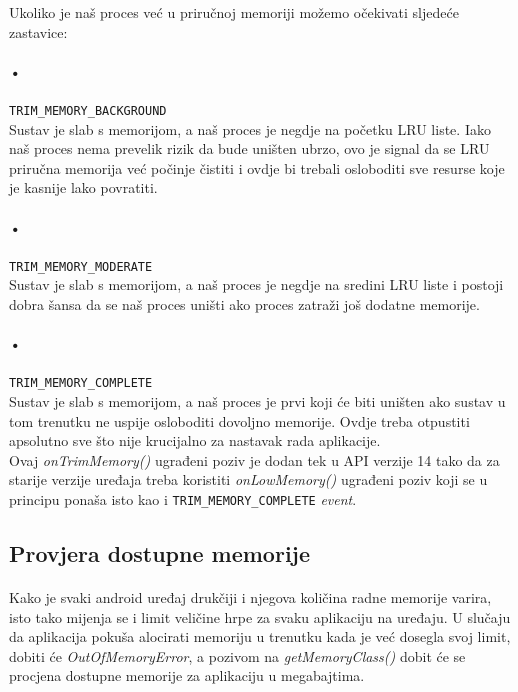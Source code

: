 \documentclass[times, utf8, zavrsni]{fer}
\begin{document}
\noindent
Ukoliko je naš proces već u priručnoj memoriji možemo očekivati sljedeće zastavice:

\paragraph{•}
\verb|TRIM_MEMORY_BACKGROUND|\\
Sustav je slab s memorijom, a naš proces je negdje na početku LRU liste. Iako naš proces nema prevelik rizik da bude uništen ubrzo, ovo je signal da se LRU priručna memorija već počinje čistiti i ovdje bi trebali osloboditi sve resurse koje je kasnije lako povratiti.

\paragraph{•}
\verb|TRIM_MEMORY_MODERATE|\\
Sustav je slab s memorijom, a naš proces je negdje na sredini LRU liste i postoji dobra šansa da se naš proces uništi ako proces zatraži još dodatne memorije.

\paragraph{•}
\verb|TRIM_MEMORY_COMPLETE|\\
Sustav je slab s memorijom, a naš proces je prvi koji će biti uništen ako sustav u tom trenutku ne uspije osloboditi dovoljno memorije. Ovdje treba otpustiti apsolutno sve što nije krucijalno za nastavak rada aplikacije.\\

Ovaj \textit{onTrimMemory()} ugrađeni poziv je dodan tek u API verzije 14 tako da za starije verzije uređaja treba koristiti \textit{onLowMemory()} ugrađeni poziv koji se u principu ponaša isto kao i \verb|TRIM_MEMORY_COMPLETE| \textit{event}.

\subsection{Provjera dostupne memorije}
\paragraph{}
Kako je svaki android uređaj drukčiji i njegova količina radne memorije varira, isto tako mijenja se i limit veličine hrpe za svaku aplikaciju na uređaju. U slučaju da aplikacija pokuša alocirati memoriju u trenutku kada je već dosegla svoj limit, dobiti će \textit{OutOfMemoryError}, a pozivom na \textit{getMemoryClass()} dobit će se procjena dostupne memorije za aplikaciju u megabajtima.\\
\end{document}
